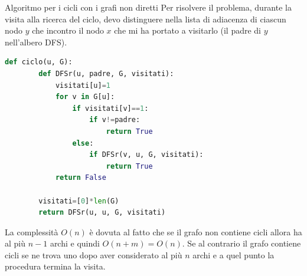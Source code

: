 \begin{Algoritmo}{Algoritmo per i cicli con i grafi non diretti}{}
   Per risolvere il problema, durante la visita alla ricerca del ciclo, devo distinguere nella lista di adiacenza di ciascun nodo $y$ che incontro il nodo $x$ che mi ha portato a visitarlo (il padre di $y$ nell'albero DFS).
    
    \begin{lstlisting}[language=Python]
    def ciclo(u, G):
        def DFSr(u, padre, G, visitati):
            visitati[u]=1
            for v in G[u]:
                if visitati[v]==1:
                    if v!=padre:
                        return True
                else:
                    if DFSr(v, u, G, visitati):
                        return True
            return False
    
        visitati=[0]*len(G)
        return DFSr(u, u, G, visitati)
    \end{lstlisting}

    La complessità $O(n)$ è dovuta al fatto che se il grafo non contiene cicli allora ha al più $n-1$ archi e quindi $O(n+m)=O(n)$. Se al contrario il grafo contiene cicli se ne trova uno dopo aver considerato al più $n$ archi e a quel punto la procedura termina la visita.
\end{Algoritmo}

